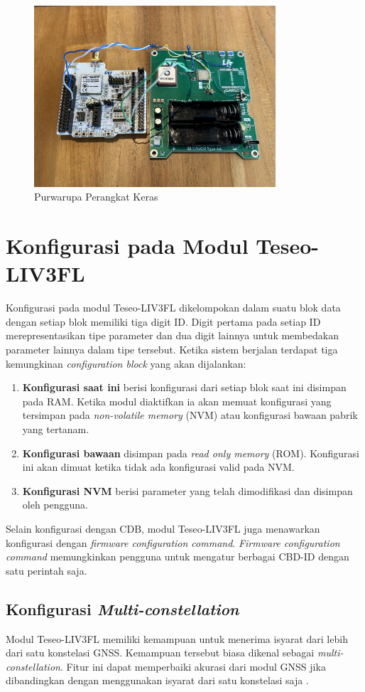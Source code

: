 \begin{figure}[H]
	\centering
	\includegraphics[width=9cm]{contents/chapter-3/purwarupa.jpg}
	\caption{Purwarupa Perangkat Keras}
	\label{Fig: purwarupa-alat}
\end{figure}

\section{Konfigurasi pada Modul Teseo-LIV3FL}
Konfigurasi pada modul Teseo-LIV3FL dikelompokan dalam suatu blok data dengan setiap blok memiliki tiga digit ID. Digit pertama pada setiap ID merepresentasikan tipe parameter dan dua digit lainnya untuk membedakan parameter lainnya dalam tipe tersebut. Ketika sistem berjalan terdapat tiga kemungkinan \textit{configuration block} yang akan dijalankan:
\begin{enumerate}
	\item \textbf{Konfigurasi saat ini} berisi konfigurasi dari setiap blok saat ini disimpan pada RAM. Ketika modul diaktifkan ia akan memuat konfigurasi yang tersimpan pada \textit{non-volatile memory} (NVM) atau konfigurasi bawaan pabrik yang tertanam.
	\item \textbf{Konfigurasi bawaan} disimpan pada \textit{read only memory} (ROM). Konfigurasi ini akan dimuat ketika tidak ada konfigurasi valid pada NVM.
	\item \textbf{Konfigurasi NVM} berisi parameter yang telah dimodifikasi dan disimpan oleh pengguna.
\end{enumerate}

Selain konfigurasi dengan CDB, modul Teseo-LIV3FL juga menawarkan konfigurasi dengan \textit{firmware configuration command}. \textit{Firmware configuration command} memungkinkan pengguna untuk mengatur berbagai CBD-ID dengan satu perintah saja.

\subsection{Konfigurasi \textit{Multi-constellation}}
Modul Teseo-LIV3FL memiliki kemampuan untuk menerima isyarat dari lebih dari satu konstelasi GNSS. Kemampuan tersebut biasa dikenal sebagai \textit{multi-constellation}. Fitur ini dapat memperbaiki akurasi dari modul GNSS jika dibandingkan dengan menggunakan isyarat dari satu konstelasi saja \cite{An2020}.

